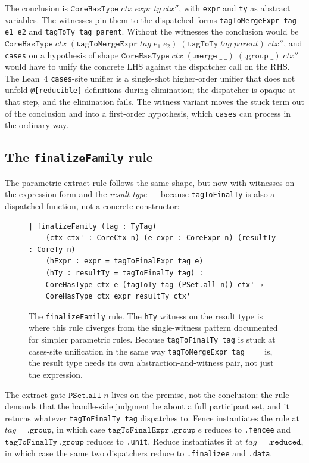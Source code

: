 \documentclass[acmsmall,screen,review,anonymous,nonacm]{acmart}
\newcommand{\CoreHasType}{\texttt{CoreHasType}}
\begin{document}
The conclusion is $\CoreHasType\;\mathit{ctx}\;\mathit{expr}\;\mathit{ty}\;\mathit{ctx''}$, with \texttt{expr} and \texttt{ty} as abstract variables. The witnesses pin them to the dispatched forms \texttt{tagToMergeExpr tag e1 e2} and \texttt{tagToTy tag parent}. Without the witnesses the conclusion would be $\CoreHasType\;\mathit{ctx}\;(\texttt{tagToMergeExpr}\;\mathit{tag}\;e_1\;e_2)\;(\texttt{tagToTy}\;\mathit{tag}\;\mathit{parent})\;\mathit{ctx''}$, and \texttt{cases} on a hypothesis of shape $\CoreHasType\;\mathit{ctx}\;(\texttt{.merge}\;\_\;\_)\;(\texttt{.group}\;\_)\;\mathit{ctx''}$ would have to unify the concrete LHS against the dispatcher call on the RHS. The Lean~4 \texttt{cases}-site unifier is a single-shot higher-order unifier that does not unfold \texttt{@[reducible]} definitions during elimination; the dispatcher is opaque at that step, and the elimination fails. The witness variant moves the stuck term out of the conclusion and into a first-order hypothesis, which \texttt{cases} can process in the ordinary way.

\subsection{The \texttt{finalizeFamily} rule}\label{sec:finalizefamily}

The parametric extract rule follows the same shape, but now with witnesses on the expression form and the \emph{result type} --- because \texttt{tagToFinalTy} is also a dispatched function, not a concrete constructor:

\begin{figure}[t]
\begin{lstlisting}
| finalizeFamily (tag : TyTag)
    (ctx ctx' : CoreCtx n) (e expr : CoreExpr n) (resultTy : CoreTy n)
    (hExpr : expr = tagToFinalExpr tag e)
    (hTy : resultTy = tagToFinalTy tag) :
    CoreHasType ctx e (tagToTy tag (PSet.all n)) ctx' →
    CoreHasType ctx expr resultTy ctx'
\end{lstlisting}
\caption{The \texttt{finalizeFamily} rule. The \texttt{hTy} witness on the result type is where this rule diverges from the single-witness pattern documented for simpler parametric rules. Because \texttt{tagToFinalTy tag} is stuck at cases-site unification in the same way \texttt{tagToMergeExpr tag \_ \_} is, the result type needs its own abstraction-and-witness pair, not just the expression.}
\label{fig:finalizefamily}
\end{figure}

The extract gate $\texttt{PSet.all}\;n$ lives on the premise, not the conclusion: the rule demands that the handle-side judgment be about a full participant set, and it returns whatever \texttt{tagToFinalTy tag} dispatches to. Fence instantiates the rule at $\mathit{tag} = \texttt{.group}$, in which case $\texttt{tagToFinalExpr}\;\texttt{.group}\;e$ reduces to \texttt{.fence\;e} and $\texttt{tagToFinalTy}\;\texttt{.group}$ reduces to \texttt{.unit}. Reduce instantiates it at $\mathit{tag} = \texttt{.reduced}$, in which case the same two dispatchers reduce to \texttt{.finalize\;e} and \texttt{.data}.
\end{document}
